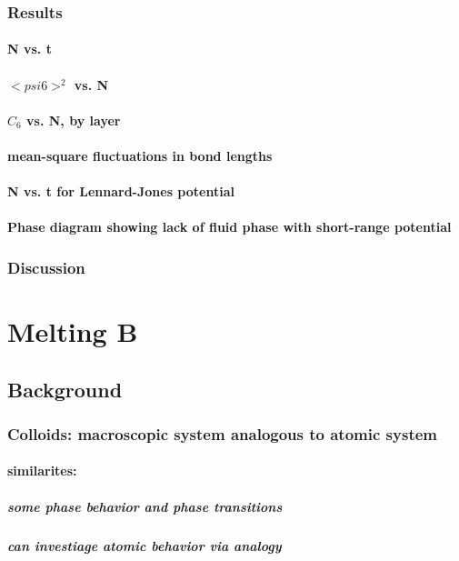 \documentclass{article}
\begin{document}
\subsubsection{Results}
\label{sec-1.3.6}
\paragraph{N vs. t}
\label{sec-1.3.6.1}
\paragraph{$< psi6 >^2$ vs. N}
\label{sec-1.3.6.2}
\paragraph{$C_6$ vs. N, by layer}
\label{sec-1.3.6.3}
\paragraph{mean-square fluctuations in bond lengths}
\label{sec-1.3.6.4}
\paragraph{N vs. t for Lennard-Jones potential}
\label{sec-1.3.6.5}
\paragraph{Phase diagram showing lack of fluid phase with short-range potential}
\label{sec-1.3.6.6}
\subsubsection{Discussion}
\label{sec-1.3.7}
\section{Melting B}
\label{sec-2}
\subsection{Background}
\label{sec-2.1}
\subsubsection{Colloids: macroscopic system analogous to atomic system}
\label{sec-2.1.1}
\paragraph{similarites:}
\label{sec-2.1.1.1}
\subparagraph{some phase behavior and phase transitions}
\label{sec-2.1.1.1.1}
\subparagraph{can investiage atomic behavior via analogy}
\label{sec-2.1.1.1.2}
\end{document}
